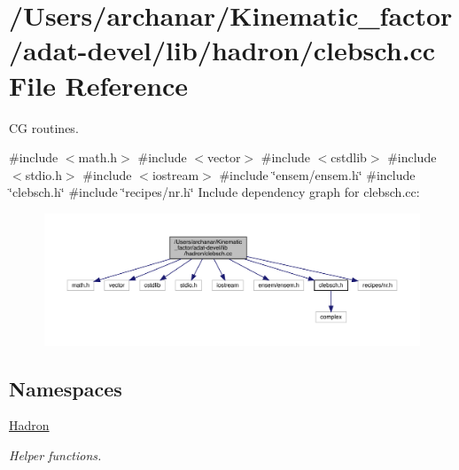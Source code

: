 \hypertarget{adat-devel_2lib_2hadron_2clebsch_8cc}{}\section{/\+Users/archanar/\+Kinematic\+\_\+factor/adat-\/devel/lib/hadron/clebsch.cc File Reference}
\label{adat-devel_2lib_2hadron_2clebsch_8cc}


CG routines.  


{\ttfamily \#include $<$math.\+h$>$}\newline
{\ttfamily \#include $<$vector$>$}\newline
{\ttfamily \#include $<$cstdlib$>$}\newline
{\ttfamily \#include $<$stdio.\+h$>$}\newline
{\ttfamily \#include $<$iostream$>$}\newline
{\ttfamily \#include \char`\"{}ensem/ensem.\+h\char`\"{}}\newline
{\ttfamily \#include \char`\"{}clebsch.\+h\char`\"{}}\newline
{\ttfamily \#include \char`\"{}recipes/nr.\+h\char`\"{}}\newline
Include dependency graph for clebsch.\+cc\+:
\nopagebreak
\begin{figure}[H]
\begin{center}
\leavevmode
\includegraphics[width=350pt]{d7/d76/adat-devel_2lib_2hadron_2clebsch_8cc__incl}
\end{center}
\end{figure}
\subsection*{Namespaces}
\begin{DoxyCompactItemize}
\item 
 \mbox{\hyperlink{namespaceHadron}{Hadron}}
\begin{DoxyCompactList}\small\item\em Helper functions. \end{DoxyCompactList}\end{DoxyCompactItemize}
